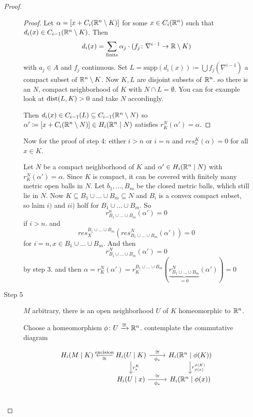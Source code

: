 \documentclass[language=english]{TemplateLecture}
\begin{document}
\begin{proof}
\begin{description}
    \begin{proof}
        Let \(\alpha = [x + C_i(\mathbb{R}^n \setminus K)]\) for some \(x \in C_i(\mathbb{R}^n)\) such that \(d_i(x) \in C_{i-1}(\mathbb{R}^n\setminus K)\). Then
        \[d_i(x) = \sum_{\text{finite}} \alpha_j \cdot (f_j\colon \nabla^{i-1} \to \mathbb{R}\setminus K)\]
        with \(a_j \in A\) and \(f_j\) continuous. Set \(L = \mathrm{supp}(d_i(x)) \coloneq \bigcup f_j(\nabla^{i-1})\) a compact subset of \(\mathbb{R}^n\setminus K\). Now \(K,L\) are disjoint subsets of \(\mathbb{R}^n\). so there is an \(N\), compact neighborhood of \(K\) with \(N \cap L = \emptyset\). You can for example look at \(\operatorname{dist}(L,K) > 0\) and take \(N\) accordingly.

        Then \(d_i(x) \in C_{i-1}(L) \subseteq C_{i-1}(\mathbb{R}^n \setminus N)\) so \(\alpha' \coloneq [x + C_i(\mathbb{R}^n \setminus N)] \in H_i(\mathbb{R}^n \mid N)\) satisfies \(r_K^N(\alpha') = \alpha\).
    \end{proof}

    Now for the proof of step 4: either \(i > n\) or \(i = n\) and \(res_x^K(\alpha) = 0\) for all \(x \in K\).

    Let \(N\) be a compact neighborhood of \(K\) and \(\alpha' \in H_i(\mathbb{R}^n \mid N)\) with \(r_K^N(\alpha') = \alpha\). Since \(K\) is  compact, it can be covered with finitely many metric open balls in \(N\). Let \(b_1, \dots, B_m\) be the closed metric balls, whlich still lie in \(N\). Now
    \(K \subseteq B_1 \cup \dots \cup B_m \subseteq N\) and \(B_i\) is a convex compact subset, so laim \(i)\) and \(ii)\) holf for \(B_1 \cup \dots \cup B_m\). So
    \[r_{B_1 \cup \dots \cup B_m}^n(\alpha') = 0\]
    if \(i > n\). and
    \[res_X^{B_1\cup \dots \cup B_m}(res_{B_1 \cup \dots \cup B_m}^N(\alpha')) = 0\]
    for \(i = n, x \in B_1 \cup \dots \cup B_m\). And then
    \[r_{B_1 \cup \dots \cup B_m}^N(\alpha') = 0\] by step 3. and then \(\alpha = r_K^N(\alpha') = r_K^{B_1 \cup \dots \cup B_m}(\underbrace{r_{B_1\cup \dots \cup B_m}^N}_{= 0}(\alpha')) = 0\)

    \item[Step 5] \(M\) arbitrary, there is an open neighborhood \(U\) of \(K\) homeomorphic to \(\mathbb{R}^n\).
    
    Choose a homeomorphism \(\phi\colon U \xrightarrow{\cong} \mathbb{R}^n\). contemplate the commutative diagram

    \[\begin{tikzcd}
        H_i(M \mid K) & H_i(U \mid K)\ar[d, "r_*^K"]  \ar[l, "\cong", "\text{excision}"'] \ar[r, "\phi_*"', "\cong"] & H_i(\IR^n \mid \phi(K)) \ar[d, "r_{\phi(x)}^{\phi(K)}"] \\
        & H_i(U\mid x) \ar[r, "\cong", "\phi_*"'] & H_i(\IR^n \mid \phi(x)) \\
    \end{tikzcd}\]


\end{description}
\end{proof}
\end{document}
